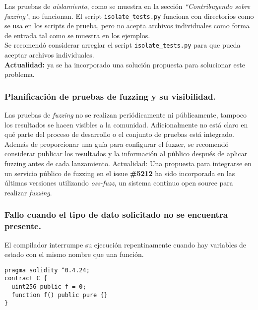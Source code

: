 Las pruebas de \textit{aislamiento}, como se muestra en la sección \textit{``Contribuyendo sobre fuzzing"}\cite{ReadTheDocsSolidityContributingFuzzing}, no funcionan. El script \texttt{isolate\_tests.py}\cite{GHisolatetests} funciona con directorios como se usa en los scripts de prueba, pero no acepta archivos individuales como forma de entrada tal como se muestra en los ejemplos.\\

Se recomendó considerar arreglar el script \texttt{isolate\_tests.py} para que pueda aceptar archivos individuales.\\

\textbf{Actualidad:} ya se ha incorporado una solución propuesta\cite{GHPR4434} para solucionar este problema.\\

\subsubsection{Planificación de pruebas de fuzzing y su visibilidad.}

Las pruebas de \textit{fuzzing} no se realizan periódicamente ni públicamente, tampoco los resultados se hacen visibles a la comunidad. Adicionalmente no está claro en qué parte del proceso de desarrollo o el conjunto de pruebas está integrado.\\

Además de proporcionar una guía para configurar el fuzzer, se recomendó considerar publicar los resultados y la información al público después de aplicar fuzzing antes de cada lanzamiento.
Actualidad: Una propuesta para integrarse en un servicio público de fuzzing en el issue \textbf{\#5212}\cite{GHI5212} ha sido incorporada en las últimas versiones utilizando \textit{oss-fuzz}, un sistema contínuo open source para realizar \textit{fuzzing}.\\

\subsubsection{Fallo cuando el tipo de dato solicitado no se encuentra presente.}

El compilador interrumpe su ejecución repentinamente cuando hay variables de estado con el mismo nombre que una función.\\

\begin{lstlisting}[language=Solidity, caption={Código de ejemplo tipo de dato solicitado no presente.}]
pragma solidity ^0.4.24;
contract C {
  uint256 public f = 0;
  function f() public pure {}
}
\end{lstlisting}

